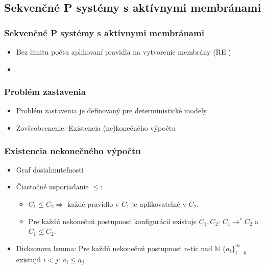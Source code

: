 
\subsection{Sekvenčné P systémy s aktívnymi membránami} %
\label{sub:sekven_n_p_syst_my_s_akt_vnymi_membr_nami}

\begin{frame}[t]\frametitle{Sekvenčné P systémy s aktívnymi membránami}
  \begin{itemize}
    \item Bez limitu počtu aplikovaní pravidla na vytvorenie membrány (RE \cite{Ibarra05Active})
    \pause
    \item {}
  \end{itemize}

  
\end{frame}

\begin{frame}[t]\frametitle{Problém zastavenia}
  \begin{itemize}
    \item Problém zastavenia je definovaný pre deterministické modely
    \pause
    \item Zovšeobecnenie: Existencia (ne)konečného výpočtu
  \end{itemize}

\end{frame}
\note{}

\begin{frame}[t]\frametitle{Existencia nekonečného výpočtu}
  \begin{itemize}
    \item Graf dosiahnuteľnosti
    \pause
    \item Čiastočné usporiadanie $\leq$:
    \begin{itemize}
      \item $C_1 \leq C_2 \Rightarrow$ každé pravidlo v $C_1$ je aplikovateľné v $C_2$.
      \pause
      \item Pre každú nekonečnú postupnosť konfigurácií existuje $C_1, C_2$: $C_1 \rightarrow^* C_2$ a $C_1 \leq C_2$.
    \end{itemize}
    \pause
    \item Dicksonova lemma: Pre každú nekonečnú postupnosť n-tíc nad $\mathbb{N}$ $\{a_i\}_{i=0}^\infty$ existujú $i<j$: $a_i\leq a_j$
  \end{itemize}
\end{frame}

